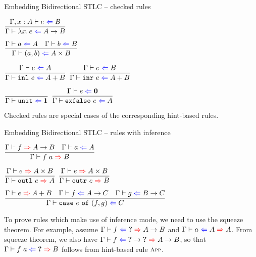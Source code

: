 \documentclass{beamer}
\begin{document}
\begin{frame}{Embedding Bidirectional STLC -- checked rules}

\begin{center}
  $\infrule{\fullcheck{\extend{\Gamma}{x}{A}}{e}{B}}{\check{\fun{x}{e}}{\Fun{A}{B}}}$

  \vspace{2em}

  $\infrule{\check{a}{A} \quad \check{b}{B}}{\check{\pair{a}{b}}{\Prod{A}{B}}}$

  \vspace{2em}

  $\infrule{\check{e}{A}}{\check{\inl{e}}{\Sum{A}{B}}}$ \quad
  $\infrule{\check{e}{B}}{\check{\inr{e}}{\Sum{A}{B}}}$

  \vspace{2em}

  $\infrule{}{\check{\unit}{\Unit}}$ \quad
  $\infrule{\check{e}{\Empty}}{\check{\exfalso{e}}{A}}$
\end{center}

\vspace{1em}

Checked rules are special cases of the corresponding hint-based rules.

\end{frame}

\begin{frame}{Embedding Bidirectional STLC -- rules with inference}

\begin{center}
  $\infrule{\infer{f}{\Fun{A}{B}} \quad \check{a}{A}}{\infer{\app{f}{a}}{B}}$

  \vspace{2em}

  $\infrule{\infer{e}{\Prod{A}{B}}}{\infer{\outl{e}}{A}}$ \quad
  $\infrule{\infer{e}{\Prod{A}{B}}}{\infer{\outr{e}}{B}}$

  \vspace{2em}

  $\infrule{\infer{e}{\Sum{A}{B}} \quad \check{f}{\Fun{A}{C}} \quad \check{g}{\Fun{B}{C}}}{\check{\case{e}{f}{g}}{C}}$
\end{center}

\vspace{1em}

To prove rules which make use of inference mode, we need to use the squeeze theorem. For example, assume $\hinting{f}{\Hole}{\Fun{A}{B}}$ and $\hinting{a}{A}{A}$. From squeeze theorem, we also have $\hinting{f}{\Fun{\Hole}{\Hole}}{\Fun{A}{B}}$, so that $\hinting{\app{f}{a}}{\Hole}{B}$ follows from hint-based rule $\textsc{\footnotesize{App}}$.

\end{frame}
\end{document}
